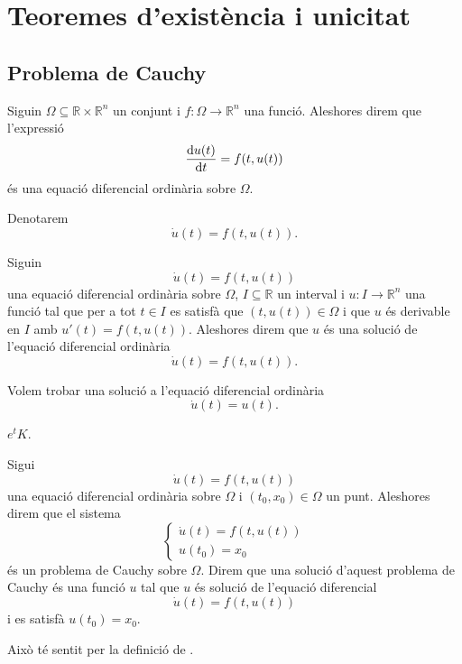 \documentclass[../../Main.tex]{subfiles}
\begin{document}
\section{Teoremes d'existència i unicitat}
	\subsection{Problema de Cauchy}
	\begin{definition}
		\label{def:equació diferencial ordinària}
		Siguin \(\Omega\subseteq\mathbb{R}\times\mathbb{R}^{n}\) un conjunt i \(f\colon\Omega\longrightarrow\mathbb{R}^{n}\) una funció.
		Aleshores direm que l'expressió
		\[
		    \frac{\mathop{}\!\mathrm{d} u(t)}{\mathop{}\!\mathrm{d} t}=f(t,u(t))
		\]
		és una equació diferencial ordinària sobre \(\Omega\).
		
		Denotarem
		\[
		    \dot{u}(t)=f(t,u(t)).
		\]
	\end{definition}
	\begin{definition}
		\label{def:solució d'una equació diferencial ordinària}
		Siguin
		\[
		    \dot{u}(t)=f(t,u(t))
		\]
		una equació diferencial ordinària sobre \(\Omega\), \(I\subseteq\mathbb{R}\) un interval i \(u\colon I\longrightarrow\mathbb{R}^{n}\) una funció tal que per a tot \(t\in I\) es satisfà que \((t,u(t))\in\Omega\) i que \(u\) és derivable en \(I\) amb \(u'(t)=f(t,u(t))\).
		Aleshores direm que \(u\) és una solució de l'equació diferencial ordinària
		\[
		    \dot{u}(t)=f(t,u(t)).
		\]
	\end{definition}
	\begin{example}	
		\label{ex:exemple d'una equació diferencial 1}
		\label{ex:exemple edos de la exponencial}
		Volem trobar una solució a l'equació diferencial ordinària
		\[
		    \dot{u}(t)=u(t).
		\]
		\begin{solution}
			\(e^{t}K\).
		\end{solution}
	\end{example}
	\begin{definition}
		\label{def:problema de Cauchy}
		\label{def:solució d'un problema de Cauchy}
		Sigui
		\[
		    \dot{u}(t)=f(t,u(t))
		\]
		una equació diferencial ordinària sobre \(\Omega\) i \((t_{0},x_{0})\in\Omega\) un punt.
		Aleshores direm que el sistema
		\[\begin{cases*}
			\displaystyle \dot{u}(t)=f(t,u(t)) \\
			\displaystyle u(t_{0})=x_{0}
		\end{cases*}\]
		és un problema de Cauchy sobre \(\Omega\).
		Direm que una solució d'aquest problema de Cauchy és una funció \(u\) tal que \(u\) és solució de l'equació diferencial
		\[
		    \dot{u}(t)=f(t,u(t))
		\]
		i es satisfà \(u(t_{0})=x_{0}\).
		
		Això té sentit per la definició de .
	\end{definition}
\end{document}

